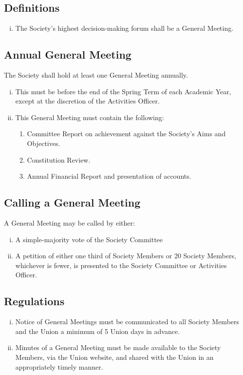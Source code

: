 \subsection{Definitions}
\begin{enumerate}[i.]
    \item The Society’s highest decision-making forum shall be a General Meeting.
\end{enumerate}

\subsection{Annual General Meeting}
The Society shall hold at least one General Meeting annually.
\begin{enumerate}[i.]
    \item This must be before the end of the Spring Term of each Academic Year, except at the discretion of the Activities Officer.
    \item This General Meeting must contain the following:
    \begin{enumerate}[1.]
        \item Committee Report on achievement against the Society’s Aims and Objectives.
        \item Constitution Review.
        \item Annual Financial Report and presentation of accounts.
    \end{enumerate}
\end{enumerate}

\subsection{Calling a General Meeting}
A General Meeting may be called by either:
\begin{enumerate}[i.]
    \item A simple-majority vote of the Society Committee
    \item A petition of either one third of Society Members or 20 Society Members, whichever is fewer, is presented to the Society Committee or Activities Officer.
\end{enumerate}

\subsection{Regulations}
\begin{enumerate}[i.]
    \item Notice of General Meetings must be communicated to all Society Members and the Union a minimum of 5 Union days in advance.
    \item Minutes of a General Meeting must be made available to the Society Members, via the Union website, and shared with the Union in an appropriately timely manner.
\end{enumerate}

